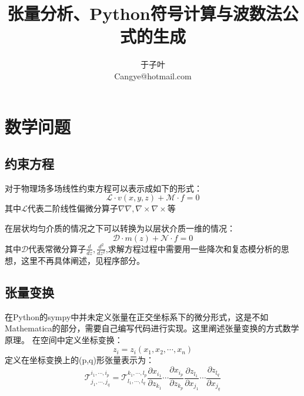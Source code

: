 \documentclass[UTF8]{article}
\author{于子叶\\Cangye@hotmail.com}
\title{张量分析、Python符号计算与波数法公式的生成}
\begin{document}
    \maketitle
    \section{数学问题}
        \subsection{约束方程}
            
对于物理场多场线性约束方程可以表示成如下的形式：
\begin{equation}
\mathcal{L}\cdot {v}(x,y,z)+\mathcal{M}\cdot {f}=0
\end{equation}
其中$\mathcal{L}$代表二阶线性偏微分算子$\nabla\nabla,\nabla\times\nabla\times$等

在层状均匀介质的情况之下可以转换为以层状介质一维的情况：
\begin{equation}
\mathcal{D} \cdot {m}(z)+\mathcal{N} \cdot {f}=0
\end{equation}
其中$\mathcal{D}$代表常微分算子$\frac{d}{dz},\frac{d^2}{dz^2}$,求解方程过程中需要用一些降次和复态模分析的思想，这里不再具体阐述，见程序部分。
        \subsection{张量变换}
在Python的sympy中并未定义张量在正交坐标系下的微分形式，这是不如Mathematica的部分，需要自己编写代码进行实现。这里阐述张量变换的方式数学原理。
在空间中定义坐标变换：
\begin{equation}
z_i=z_i(x_1,x_2,\cdots,x_n)
\end{equation}
定义在坐标变换上的(p,q)形张量表示为：
\begin{equation}
\mathcal{T}^{i_1,\cdots,i_p}_{j_1,\cdots,j_q}
=
\mathcal{T}^{k_1,\cdots,l_p}_{l_1,\cdots,l_q}
\frac{\partial x_{i_1}}{\partial z_{k_1}}
\cdots
\frac{\partial x_{i_p}}{\partial z_{k_p}}
\frac{\partial z_{l_1}}{\partial x_{j_1}}
\cdots
\frac{\partial z_{l_q}}{\partial x_{j_q}}
\end{equation}
\end{document}
